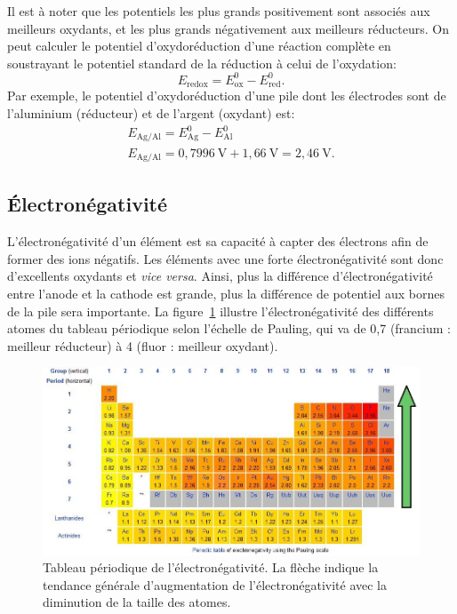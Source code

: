 \documentclass[12pt,oneside,letterpaper]{article}
\begin{document}
Il est à noter que les potentiels les plus grands positivement sont associés aux meilleurs oxydants, et les plus grands négativement aux meilleurs réducteurs. On peut calculer le potentiel d'oxydoréduction d'une réaction complète en soustrayant le potentiel standard de la réduction à celui de l'oxydation:
\begin{equation}
E_{\mathrm{redox}}=E^0_{\mathrm{ox}}-E^0_{\mathrm{red}}.
\end{equation}
Par exemple, le potentiel d'oxydoréduction d'une pile dont les électrodes sont de l'aluminium (réducteur) et de l'argent (oxydant) est:
\begin{gather*}
E_{\mathrm{Ag/Al}}=E^0_{\mathrm{Ag}}-E^0_{\mathrm{Al}}\\
E_{\mathrm{Ag/Al}}=0,\!7996~\mathrm{V}+1,\!66~\mathrm{V}=2,\!46~\mathrm{V}.
\end{gather*}


\subsection{Électronégativité}

L'électronégativité d'un élément est sa capacité à capter des électrons afin de former des ions négatifs. Les éléments avec une forte électronégativité sont donc d'excellents oxydants et \textit{vice versa}. Ainsi, plus la différence d'électronégativité entre l'anode et la cathode est grande, plus la différence de potentiel aux bornes de la pile sera importante. La figure~\ref{Pauling} illustre l'électronégativité des différents atomes du tableau périodique selon l'échelle de Pauling, qui va de 0,7 (francium : meilleur réducteur) à 4 (fluor : meilleur oxydant).

\begin{figure}[h]
\includegraphics[width=\textwidth]{Labos-Complements/Lab01/L01_pauling-scale.jpg}
\caption{\label{Pauling}Tableau périodique de l'électronégativité. La flèche indique la tendance générale d'augmentation de l'électronégativité avec la diminution de la taille des atomes.}
\end{figure}
\end{document}
